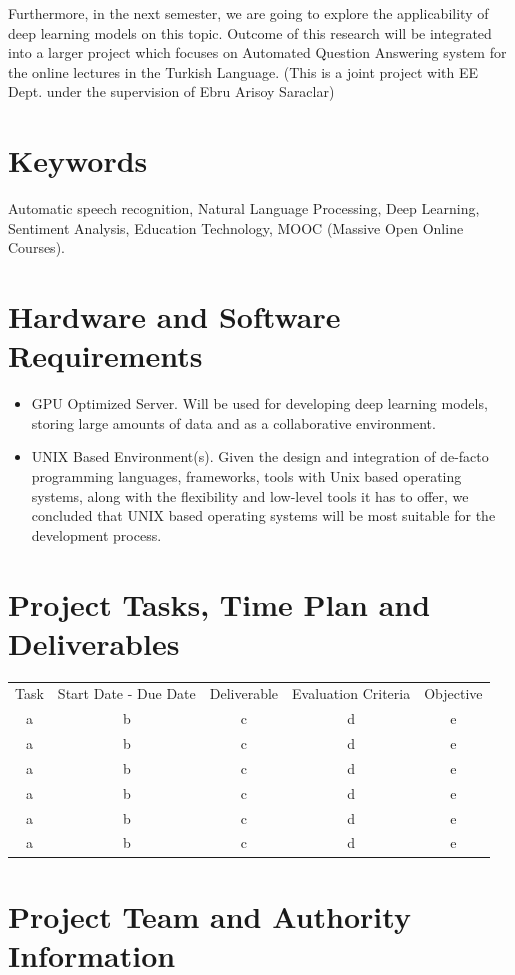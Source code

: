\documentclass[10pt]{article}
\begin{document}
	Furthermore, in the next semester, we are going to explore the applicability of deep learning models on this topic. Outcome of this research will be integrated into a larger project which focuses on Automated Question Answering system for the online lectures in the Turkish Language. (This is a joint project with EE Dept. under the supervision of Ebru Arisoy Saraclar)
	
	\section{Keywords}
	
	Automatic speech recognition, Natural Language Processing, Deep Learning, Sentiment Analysis, Education Technology, MOOC (Massive Open Online Courses). \newline \par
	
	\section{Hardware and Software Requirements}
	
	\begin{itemize}[label=\textcolor{darkazure}{\Large\textbullet}]
		\item GPU Optimized Server. Will be used for developing deep learning models, storing large amounts of data and as a collaborative environment.
		
		\item UNIX Based Environment(s). Given the design and integration of de-facto programming languages, frameworks, tools with Unix based operating systems, along with the flexibility and low-level tools it has to offer, we concluded that UNIX based operating systems will be most suitable for the development process.
	\end{itemize}
	
	
	\section{Project Tasks, Time Plan and Deliverables}
	
	\begin{center}
		\begin{table}[h!]
			\begin{tabular}{| c | c | c | c | c |}
				\rowcolor[RGB]{215,229,244}
				\hline
				Task & Start Date - Due Date & Deliverable & Evaluation Criteria & Objective \\
				a & b & c & d & e \\ \hline  
				a & b & c & d & e \\ \hline  
				a & b & c & d & e \\ \hline  
				a & b & c & d & e \\ \hline  
				a & b & c & d & e \\ \hline  
				a & b & c & d & e \\
				\hline  
			\end{tabular}
		\end{table}
	\end{center}
	
	
	\section{Project Team and Authority Information}
	
\end{document}
